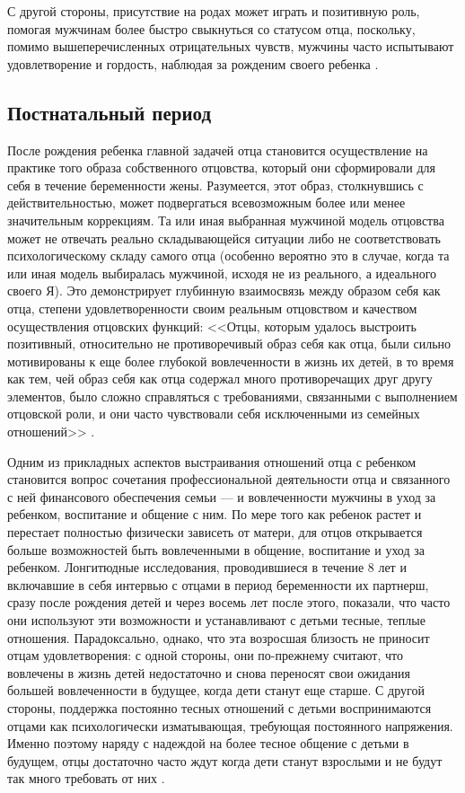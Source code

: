 \documentclass{../../common/thesisbyxetex}
\begin{document}
С другой стороны, присутствие на родах может играть и позитивную роль, помогая мужчинам более
быстро свыкнуться со статусом отца, поскольку, помимо вышеперечисленных отрицательных чувств,
мужчины часто испытывают удовлетворение и гордость, наблюдая за рожденим своего ребенка
\cite[314]{flit}.



\subsection{Постнатальный период}

После рождения ребенка главной задачей отца становится осуществление на практике того образа
собственного отцовства, который они сформировали для себя в течение беременности жены. Разумеется,
этот образ, столкнувшись с действительностью, может подвергаться всевозможным более или менее
значительным коррекциям. Та или иная выбранная мужчиной модель отцовства может не отвечать реально
складывающейся ситуации либо не соответствовать психологическому складу самого отца (особенно
вероятно это в случае, когда та или иная модель выбиралась мужчиной, исходя не из реального, а
идеального своего Я). Это демонстрирует глубинную взаимосвязь между образом себя как отца, степени
удовлетворенности своим реальным отцовством и качеством осуществления
отцовских функций: <<Отцы, которым удалось выстроить позитивный, относительно не противоречивый
образ себя как отца, были сильно мотивированы к еще более глубокой вовлеченности в жизнь их
детей, в то время как тем, чей образ себя как отца содержал много противоречащих друг другу
элементов, было сложно справляться с требованиями, связанными с выполнением отцовской роли, и
они часто чувствовали себя исключенными из семейных отношений>> \cite[314]{flit}.

Одним из прикладных аспектов выстраивания отношений отца с ребенком становится вопрос сочетания
профессиональной деятельности отца и связанного с ней финансового обеспечения семьи --- и
вовлеченности мужчины в уход за ребенком,  воспитание и общение с ним. 
По мере того как ребенок растет и перестает полностью физически зависеть от матери, для отцов
открывается больше возможностей быть вовлеченными в общение, воспитание и уход за ребенком.
Лонгитюдные исследования, проводившиеся в течение 8 лет и включавшие в себя интервью с отцами
в период беременности их партнерш, сразу после рождения детей и через восемь лет после этого,
показали, что часто они используют эти возможности и устанавливают с детьми тесные, теплые
отношения. Парадоксально, однако, что эта возросшая близость не приносит отцам удовлетворения: с
одной стороны, они по-прежнему считают, что вовлечены в жизнь детей недостаточно и снова переносят
свои ожидания большей вовлеченности в будущее, когда дети станут еще старше. С другой стороны,
поддержка постоянно тесных отношений с детьми воспринимаются отцами как
психологически изматывающая, требующая постоянного напряжения. Именно поэтому наряду с надеждой
на более тесное общение с детьми в будущем, отцы достаточно часто
ждут когда дети станут взрослыми и не будут так много требовать от них \cite[22]{long}.
\end{document}
